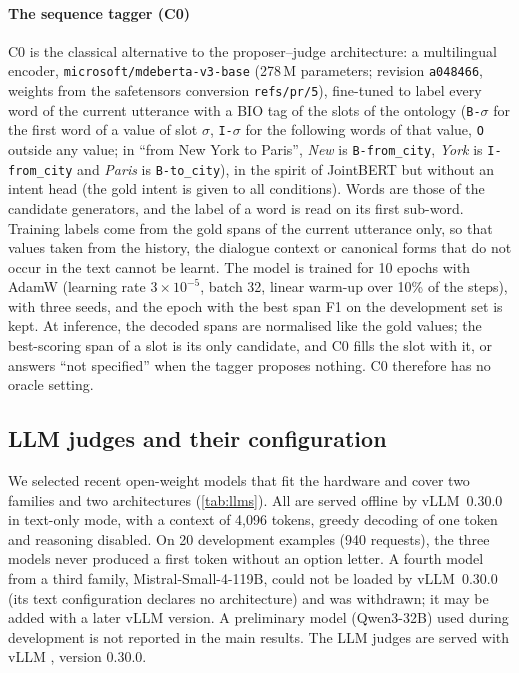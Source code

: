 \paragraph{The sequence tagger (C0)} C0 is the classical alternative to the proposer--judge architecture: a multilingual encoder, \texttt{microsoft/mdeberta-v3-base} (278\,M parameters; revision \texttt{a048466}, weights from the safetensors conversion \texttt{refs/pr/5}), fine-tuned to label every word of the current utterance with a BIO tag of the slots of the ontology (\texttt{B-}$\sigma$ for the first word of a value of slot $\sigma$, \texttt{I-}$\sigma$ for the following words of that value, \texttt{O} outside any value; in ``from New York to Paris'', \emph{New} is \texttt{B-from\_city}, \emph{York} is \texttt{I-from\_city} and \emph{Paris} is \texttt{B-to\_city}), in the spirit of JointBERT \citep{chen2019jointbert} but without an intent head (the gold intent is given to all conditions). Words are those of the candidate generators, and the label of a word is read on its first sub-word. Training labels come from the gold spans of the current utterance only, so that values taken from the history, the dialogue context or canonical forms that do not occur in the text cannot be learnt. The model is trained for 10 epochs with AdamW (learning rate $3\times10^{-5}$, batch 32, linear warm-up over 10\% of the steps), with three seeds, and the epoch with the best span F1 on the development set is kept. At inference, the decoded spans are normalised like the gold values; the best-scoring span of a slot is its only candidate, and C0 fills the slot with it, or answers ``not specified'' when the tagger proposes nothing. C0 therefore has no oracle setting.

\subsection{LLM judges and their configuration}
\label{sec:llms}

We selected recent open-weight models that fit the hardware and cover two families and two architectures (\cref{tab:llms}). All are served offline by vLLM~0.30.0 in text-only mode, with a context of 4,096 tokens, greedy decoding of one token and reasoning disabled. On 20 development examples (940 requests), the three models never produced a first token without an option letter. A fourth model from a third family, Mistral-Small-4-119B, could not be loaded by vLLM~0.30.0 (its text configuration declares no architecture) and was withdrawn; it may be added with a later vLLM version. A preliminary model (Qwen3-32B) used during development is not reported in the main results. The LLM judges are served with vLLM \citep{kwon2023vllm}, version 0.30.0.

